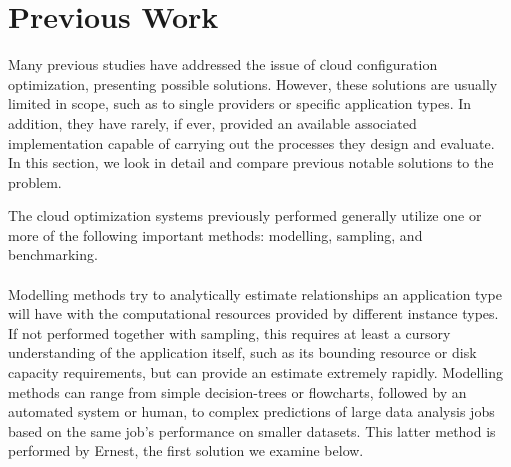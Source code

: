 \documentclass{report}
\begin{document}
\section{Previous Work}
Many previous studies have addressed the issue of cloud configuration optimization, presenting possible solutions. However, these solutions are usually limited in scope, such as to single providers or specific application types. In addition, they have rarely, if ever, provided an available associated implementation capable of carrying out the processes they design and evaluate. In this section, we look in detail and compare previous notable solutions to the problem.

The cloud optimization systems previously performed generally utilize one or more of the following important methods: modelling, sampling, and benchmarking. 

\paragraph{}
Modelling methods try to analytically estimate relationships an application type will have with the computational resources provided by different instance types. If not performed together with sampling, this requires at least a cursory understanding of the application itself, such as its bounding resource or disk capacity requirements, but can provide an estimate extremely rapidly. Modelling methods can range from simple decision-trees or flowcharts, followed by an automated system or human, to complex predictions of large data analysis jobs based on the same job's performance on smaller datasets. This latter method is performed by Ernest\cite{Venkataraman2016}, the first solution we examine below.
\end{document}
